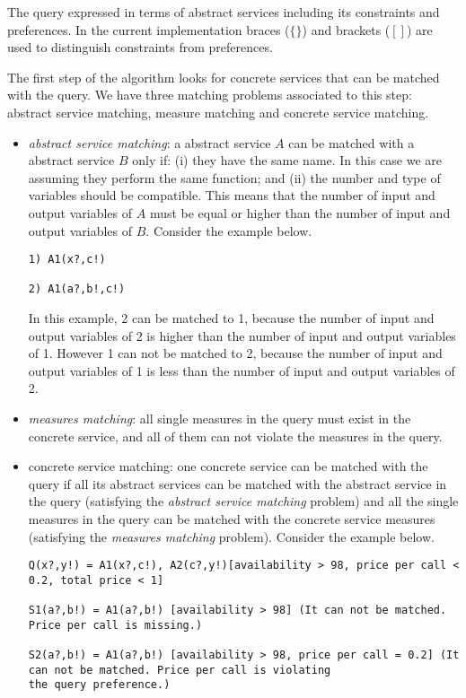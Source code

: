\documentclass{sig-alternate}
\begin{document}
The query expressed in terms of abstract services including its constraints and preferences. In the current implementation braces ($\lbrace\rbrace$) and brackets ($[]$) are used to distinguish constraints from preferences.

The first step of the algorithm looks for concrete services that can be matched with the query. We have three matching problems associated to this step: abstract service matching, measure matching and concrete service matching.
\begin{itemize}
\item \textit{abstract service matching}: a abstract service $A$ can be matched with a abstract service $B$ only if: (i) they have the same name. In this case we are assuming they perform the same function; and (ii) the number and type of variables should be compatible. This means that the number of input and output variables of $A$ must be equal or higher than the number of input and output variables of $B$. Consider the example below.
\begin{verbatim}
1) A1(x?,c!)
	
2) A1(a?,b!,c!)
\end{verbatim}
In this example, 2 can be matched to 1, because the number of input and output variables of 2 is higher than the number of input and output variables of 1.
However 1 can not be matched to 2, because the number of input and output variables of 1 is less than the number of input and output variables of 2.
\item \textit{measures matching}: all single measures in the query must exist in the concrete service, and all of them can not violate the measures in the query.
\item concrete service matching: one concrete service can be matched with the query if all its abstract services can be matched with the abstract service in the query (satisfying the \textit{abstract service matching} problem) and all the single measures in the query can be matched with the concrete service measures (satisfying the \textit{measures matching} problem). Consider the example below.
\begin{tiny}
\begin{verbatim}
Q(x?,y!) = A1(x?,c!), A2(c?,y!)[availability > 98, price per call < 0.2, total price < 1]
	
S1(a?,b!) = A1(a?,b!) [availability > 98] (It can not be matched. Price per call is missing.)

S2(a?,b!) = A1(a?,b!) [availability > 98, price per call = 0.2] (It can not be matched. Price per call is violating
the query preference.)


\end{verbatim}
\end{tiny}
\end{itemize}
\end{document}
